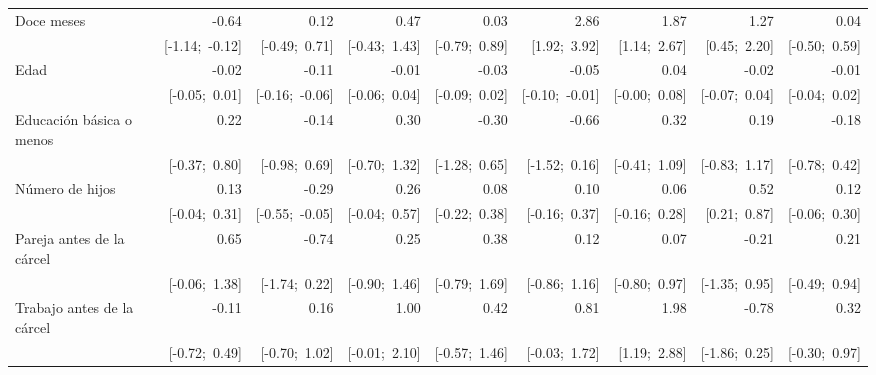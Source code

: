 \begin{sidewaystable}[htp]
\begin{center}
{\begin{tabular}{l D{.}{.}{3.11} D{.}{.}{3.11} D{.}{.}{3.11} D{.}{.}{3.11} D{.}{.}{3.11} D{.}{.}{3.11} D{.}{.}{3.11} D{.}{.}{3.11} }
\quad Doce meses                  & -0.64           & 0.12            & 0.47            & 0.03            & 2.86            & 1.87            & 1.27            & 0.04            \\
                                  & [-1.14;\ -0.12] & [-0.49;\ 0.71]  & [-0.43;\ 1.43]  & [-0.79;\ 0.89]  & [1.92;\ 3.92]   & [1.14;\ 2.67]   & [0.45;\ 2.20]   & [-0.50;\ 0.59]  \\
Edad                              & -0.02           & -0.11           & -0.01           & -0.03           & -0.05           & 0.04            & -0.02           & -0.01           \\
                                  & [-0.05;\ 0.01]  & [-0.16;\ -0.06] & [-0.06;\ 0.04]  & [-0.09;\ 0.02]  & [-0.10;\ -0.01] & [-0.00;\ 0.08]  & [-0.07;\ 0.04]  & [-0.04;\ 0.02]  \\
Educación básica o menos          & 0.22            & -0.14           & 0.30            & -0.30           & -0.66           & 0.32            & 0.19            & -0.18           \\
                                  & [-0.37;\ 0.80]  & [-0.98;\ 0.69]  & [-0.70;\ 1.32]  & [-1.28;\ 0.65]  & [-1.52;\ 0.16]  & [-0.41;\ 1.09]  & [-0.83;\ 1.17]  & [-0.78;\ 0.42]  \\
Número de hijos                   & 0.13            & -0.29           & 0.26            & 0.08            & 0.10            & 0.06            & 0.52            & 0.12            \\
                                  & [-0.04;\ 0.31]  & [-0.55;\ -0.05] & [-0.04;\ 0.57]  & [-0.22;\ 0.38]  & [-0.16;\ 0.37]  & [-0.16;\ 0.28]  & [0.21;\ 0.87]   & [-0.06;\ 0.30]  \\
Pareja antes de la cárcel         & 0.65            & -0.74           & 0.25            & 0.38            & 0.12            & 0.07            & -0.21           & 0.21            \\
                                  & [-0.06;\ 1.38]  & [-1.74;\ 0.22]  & [-0.90;\ 1.46]  & [-0.79;\ 1.69]  & [-0.86;\ 1.16]  & [-0.80;\ 0.97]  & [-1.35;\ 0.95]  & [-0.49;\ 0.94]  \\
Trabajo antes de la cárcel        & -0.11           & 0.16            & 1.00            & 0.42            & 0.81            & 1.98            & -0.78           & 0.32            \\
                                  & [-0.72;\ 0.49]  & [-0.70;\ 1.02]  & [-0.01;\ 2.10]  & [-0.57;\ 1.46]  & [-0.03;\ 1.72]  & [1.19;\ 2.88]   & [-1.86;\ 0.25]  & [-0.30;\ 0.97]  \\

\end{tabular}}
\end{center}
\end{sidewaystable}
